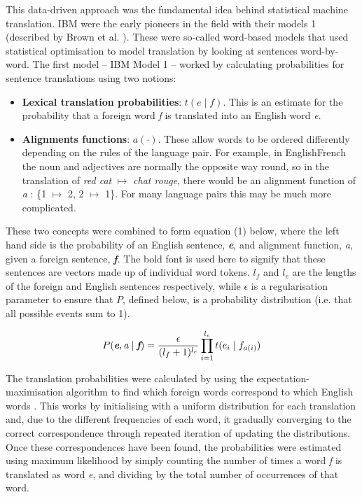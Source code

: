 \documentclass[11pt]{article}
\begin{document}
This data-driven approach was the fundamental idea behind statistical machine translation. IBM were the early pioneers in the field with their models 1 (described by Brown et al. \citeyearpar{brown-etal-1993-mathematics}). These were so-called word-based models that used statistical optimisation to model translation by looking at sentences word-by-word. The first model -- IBM Model 1 -- worked by calculating probabilities for sentence translations using two notions:

\begin{itemize}
\item \textbf{Lexical translation probabilities}: $t(e \mid f)$. This is an estimate for the probability that a foreign word \textit{f} is translated into an English word \textit{e}.
\item \textbf{Alignments functions}: $a(\cdot)$. These allow words to be ordered differently depending on the rules of the language pair. For example, in English\textendash French the noun and adjectives are normally the opposite way round, so in the translation of \textit{red cat} $\mapsto$ \textit{chat rouge}, there would be an alignment function of \textit{a} : \{1 $\mapsto$ 2, 2 $\mapsto$ 1\}. For many language pairs this may be much more complicated.
\end{itemize}

These two concepts were combined to form equation (1) below, where the left hand side is the probability of an English sentence, \textit{\textbf{e}}, and alignment function, \textit{a}, given a foreign sentence, \textit{\textbf{f}}. The bold font is used here to signify that these sentences are vectors made up of individual word tokens. $l_f$ and $l_e$ are the lengths of the foreign and English sentences respectively, while $\epsilon$ is a regularisation parameter to ensure that $P$, defined below, is a probability distribution (i.e. that all possible events sum to 1).

\begin{align}
    P(\textit{\textbf{e}}, \textit{a} \mid \textit{\textbf{f}}) = \frac{\epsilon}{(l_f+1)^{l_e}} \prod_{i = 1}^{l_e} t(e_i \mid f_{a(i)})
\end{align}

The translation probabilities were calculated by using the expectation-maximisation algorithm to find which foreign words correspond to which English words \citep[p. 89]{koehn2010}. This works by initialising with a uniform distribution for each translation and, due to the different frequencies of each word, it gradually converging to the correct correspondence through repeated iteration of updating the distributions. Once these correspondences have been found, the probabilities were estimated using maximum likelihood by simply counting the number of times a word \textit{f} is translated as word \textit{e}, and dividing by the total number of occurrences of that word.
\end{document}
